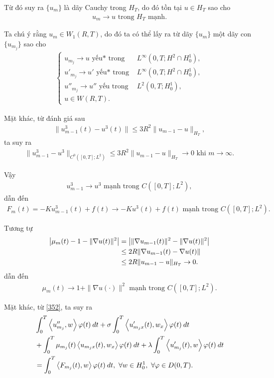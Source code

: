 \documentclass[12pt,a4paper]{article}
\theoremstyle{definition}
\theoremstyle{definition}
\begin{document}
Từ đó suy ra $\{u_m\}$ là dãy Cauchy trong $H_T$, do đó tồn tại $u \in H_T$ sao cho
\begin{align}
    u_m \to u \text{ trong } H_T \text{ mạnh}.
\end{align}

Ta chú ý rằng $u_m \in W_1(R,T)$, do đó ta có thể lấy ra từ dãy $\{u_m\}$ một dãy con $\{u_{m_j}\}$ sao cho
\begin{align} \label{378}
\begin{cases}
    u_{m_j} \to u \text{ yếu* trong } &L^\infty(0,T;H^2 \cap H^1_0), \\
    u'_{m_j} \to u' \text{ yếu* trong } &L^\infty(0,T;H^2 \cap H^1_0),\\
    u''_{m_j} \to u'' \text{ yếu trong } &L^2(0,T;H^1_0),\\
    u \in W(R,T). &
\end{cases}
\end{align}

Mặt khác, từ đánh giá sau
\begin{align}
    \|u^3_{m-1}(t) - u^3(t)\| \le 3R^2 \|u_{m-1} - u\|_{H_T},
\end{align}
ta suy ra
\begin{align}
    \|u^3_{m-1} - u^3\|_{C^0([0,T];L^2)} \le 3R^2 \|u_{m-1} - u\|_{H_T} \to 0 \text{ khi } m \to \infty.
\end{align}

Vậy
\begin{align} \label{381}
    u^3_{m-1} \to u^3 \text{ mạnh trong } C([0,T]; L^2),
\end{align}
dẫn đến
\begin{align} \label{382}
    F_m(t) = -Ku^3_{m-1}(t) + f(t) \to -Ku^3(t) + f(t) \text{ mạnh trong } C([0,T];L^2).
\end{align}

Tương tự
\begin{align*}
    \left| \mu_m(t) - 1 - \|\nabla u(t)\|^2 \right|
    &= \left| \|\nabla u_{m-1}(t)\|^2 - \|\nabla u(t)\|^2 \right| \notag \\
    &\le 2R \| \nabla u_{m-1}(t) - \nabla u(t) \| \notag \\
    &\le 2R \| u_{m-1} - u\|_{H_T} \to 0. \notag
\end{align*}
dẫn đến
\begin{align} \label{383}
    \mu_m(t) \to 1 + \|\nabla u(\cdot)\|^2 \text{ mạnh trong } C([0,T];L^2).
\end{align}

Mặt khác, từ \eqref{352}, ta suy ra
\begin{align} \label{384}
    &\int_0^T \left<u''_{m_j},w\right> \varphi(t)\:dt
    + \sigma \int_0^T \left<u'_{m_j x}(t), w_x\right> \varphi(t)\:dt \notag \\
    &+ \int_0^T \mu_{m_j}(t) \left<u_{m_j x}(t), w_x\right> \varphi(t)\:dt
    + \lambda \int_0^T \left<u'_{m_j}(t), w\right> \varphi(t)\:dt \\
    &= \int_0^T \left<F_{m_j}(t), w\right> \varphi(t)\:dt,\ \forall w \in H^1_0,\ \forall \varphi \in D(0,T). \notag
\end{align}
\end{document}
